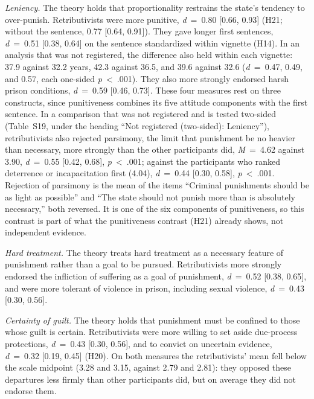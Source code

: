 \emph{Leniency.} The theory holds that proportionality restrains the state's tendency to over-punish. Retributivists were more punitive, \emph{d}~=~0.80 {[}0.66, 0.93{]} (H21; without the sentence, 0.77 {[}0.64, 0.91{]}). They gave longer first sentences, \emph{d}~=~0.51 {[}0.38, 0.64{]} on the sentence standardized within vignette (H14). In an analysis that was not registered, the difference also held within each vignette: 37.9 against 32.2 years, 42.3 against 36.5, and 39.6 against 32.6 (\emph{d}~=~0.47, 0.49, and 0.57, each one-sided \emph{p}~\textless{}~.001). They also more strongly endorsed harsh prison conditions, \emph{d}~=~0.59 {[}0.46, 0.73{]}. These four measures rest on three constructs, since punitiveness combines its five attitude components with the first sentence. In a comparison that was not registered and is tested two-sided (Table~S19, under the heading ``Not registered (two-sided): Leniency''), retributivists also rejected parsimony, the limit that punishment be no heavier than necessary, more strongly than the other participants did, \emph{M}~=~4.62 against 3.90, \emph{d}~=~0.55 {[}0.42, 0.68{]}, \emph{p}~\textless{}~.001; against the participants who ranked deterrence or incapacitation first (4.04), \emph{d}~=~0.44 {[}0.30, 0.58{]}, \emph{p}~\textless{}~.001. Rejection of parsimony is the mean of the items ``Criminal punishments should be as light as possible'' and ``The state should not punish more than is absolutely necessary,'' both reversed. It is one of the six components of punitiveness, so this contrast is part of what the punitiveness contrast (H21) already shows, not independent evidence.

\emph{Hard treatment.} The theory treats hard treatment as a necessary feature of punishment rather than a goal to be pursued. Retributivists more strongly endorsed the infliction of suffering as a goal of punishment, \emph{d}~=~0.52 {[}0.38, 0.65{]}, and were more tolerant of violence in prison, including sexual violence, \emph{d}~=~0.43 {[}0.30, 0.56{]}.

\emph{Certainty of guilt.} The theory holds that punishment must be confined to those whose guilt is certain. Retributivists were more willing to set aside due-process protections, \emph{d}~=~0.43 {[}0.30, 0.56{]}, and to convict on uncertain evidence, \emph{d}~=~0.32 {[}0.19, 0.45{]} (H20). On both measures the retributivists' mean fell below the scale midpoint (3.28 and 3.15, against 2.79 and 2.81): they opposed these departures less firmly than other participants did, but on average they did not endorse them.

